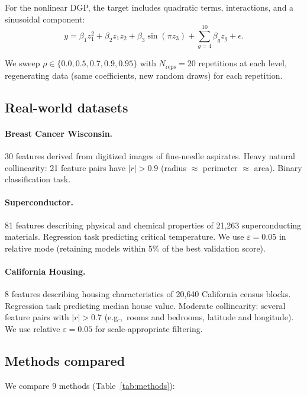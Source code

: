 \documentclass[11pt]{article}
\newcommand{\rhovar}{\rho}
\newcommand{\eg}{e.g.,\ }
\begin{document}
For the nonlinear DGP, the target includes quadratic terms, interactions,
and a sinusoidal component:
\begin{equation}
  y = \beta_1 z_1^2 + \beta_2 z_1 z_2 + \beta_3 \sin(\pi z_3) +
  \sum_{g=4}^{10} \beta_g z_g + \epsilon.
\end{equation}

We sweep $\rhovar \in \{0.0, 0.5, 0.7, 0.9, 0.95\}$ with $N_{\text{reps}}
= 20$ repetitions at each level, regenerating data (same coefficients, new
random draws) for each repetition.

\subsection{Real-world datasets}

\paragraph{Breast Cancer Wisconsin.}
30 features derived from digitized images of fine-needle aspirates. Heavy
natural collinearity: 21 feature pairs have $|r| > 0.9$ (radius $\approx$
perimeter $\approx$ area). Binary classification task.

\paragraph{Superconductor.}
81 features describing physical and chemical properties of 21,263
superconducting materials. Regression task predicting critical temperature.
We use $\varepsilon = 0.05$ in relative mode (retaining models within
5\% of the best validation score).

\paragraph{California Housing.}
8 features describing housing characteristics of 20,640 California
census blocks. Regression task predicting median house value. Moderate
collinearity: several feature pairs with $|r| > 0.7$ (\eg rooms and
bedrooms, latitude and longitude).
We use relative $\varepsilon = 0.05$ for scale-appropriate filtering.

\subsection{Methods compared}

We compare 9 methods (Table~\ref{tab:methods}):
\end{document}
